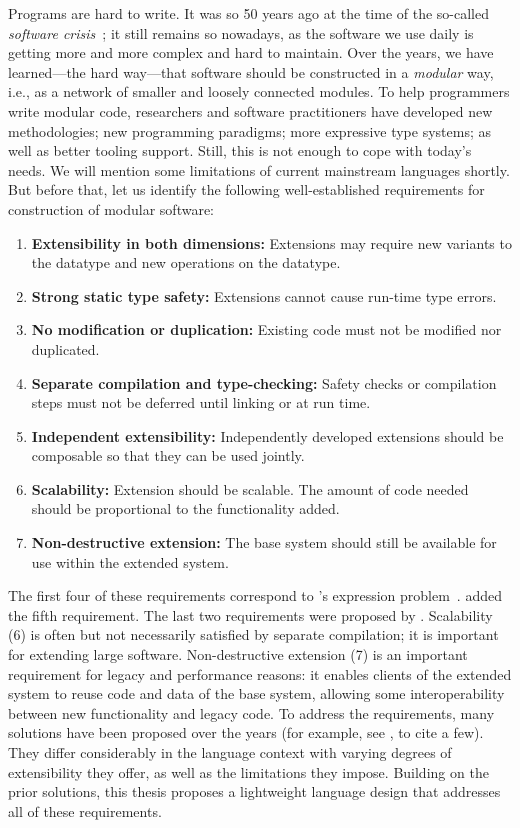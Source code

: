 Programs are hard to write. It was so 50 years ago at the time of the so-called
\textit{software crisis}~\citep{Naur:1969:SER:1102020}; it still remains so
nowadays, as the software we use daily is getting more and more complex and hard
to maintain. Over the years, we have learned---the hard way---that software
should be constructed in a \textit{modular} way, i.e., as a network of smaller
and loosely connected modules. To help programmers write modular code,
researchers and software practitioners have developed new methodologies; new
programming paradigms; more expressive type systems; as well as better tooling
support. Still, this is not enough to cope with today's needs. We will mention
some limitations of current mainstream languages shortly. But before that, let
us identify the following well-established requirements for construction of
modular software:
\begin{enumerate}
\item \textbf{Extensibility in both dimensions:} Extensions may require new
  variants to the datatype and new operations on the datatype.
\item \textbf{Strong static type safety:} Extensions cannot cause run-time type errors.
\item \textbf{No modification or duplication:} Existing code must not be
  modified nor duplicated.
\item \textbf{Separate compilation and type-checking:} Safety checks or
  compilation steps must not be deferred until linking or at run time.
\item \textbf{Independent extensibility:} Independently developed extensions
  should be composable so that they can be used jointly.
\item \textbf{Scalability:} Extension should be scalable. The amount of code
  needed should be proportional to the functionality added.
\item \textbf{Non-destructive extension:} The base system should still be
  available for use within the extended system.
\end{enumerate}
The first four of these requirements correspond to
\citeauthor{wadler1998expression}'s expression
problem~\citep{wadler1998expression}. \citet{Zenger-Odersky2005} added the fifth
requirement. The last two requirements were proposed by \citet{Nystrom:2006}.
Scalability (6) is often but not necessarily satisfied by separate compilation;
it is important for extending large software. Non-destructive extension (7) is
an important requirement for legacy and performance reasons: it enables clients
of the extended system to reuse code and data of the base system, allowing some
interoperability between new functionality and legacy code. To address the
requirements, many solutions have been proposed over the years (for example, see
\citet{oliveira2012extensibility, wang2016expression, oliveira09modular,
  swierstra_2008, Zenger-Odersky2005}, to cite a few). They differ considerably
in the language context with varying degrees of extensibility they offer, as
well as the limitations they impose. Building on the prior solutions, this
thesis proposes a lightweight language design that addresses all of these
requirements.

